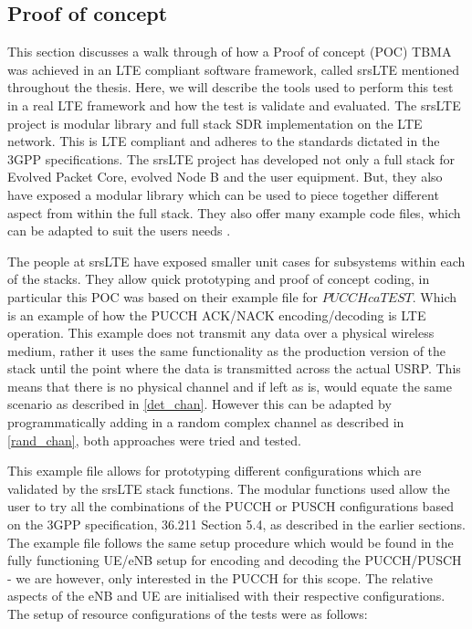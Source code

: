 \documentclass{article}
\begin{document}
\subsection{Proof of concept}\label{srslte_poc}
This section discusses a walk through of how a Proof of concept (POC) TBMA was achieved in an LTE compliant software framework, called srsLTE mentioned throughout the thesis. Here, we will describe the tools used to perform this test in a real LTE framework and how the test is validate and evaluated. The srsLTE project is modular library and full stack SDR implementation on the LTE network. This is LTE compliant and adheres to the standards dictated in the 3GPP specifications. The srsLTE project has developed not only a full stack for Evolved Packet Core, evolved Node B and the user equipment. But, they also have exposed a modular library which can be used to piece together different aspect from within the full stack. They also offer many example code files, which can be adapted to suit the users needs \cite{srsLTE}. 

The people at srsLTE have exposed smaller unit cases for subsystems within each of the stacks. They allow quick prototyping and proof of concept coding, in particular this POC was based on their example file for $PUCCH ca TEST$. Which is an example of how the PUCCH ACK/NACK encoding/decoding is LTE operation. This example does not transmit any data over a physical wireless medium, rather it uses the same functionality as the production version of the stack until the point where the data is transmitted across the actual USRP. This means that there is no physical channel and if left as is, would equate the same scenario as described in \cref{det_chan}. However this can be adapted by programmatically adding in a random complex channel as described in \cref{rand_chan}, both approaches were tried and tested. 

This example file allows for prototyping different configurations which are validated by the srsLTE stack functions. The modular functions used allow the user to try all the combinations of the PUCCH or PUSCH configurations based on the 3GPP specification, 36.211 Section 5.4, as described in the earlier sections. The example file follows the same setup procedure which would be found in the fully functioning UE/eNB setup for encoding and decoding the PUCCH/PUSCH - we are however, only interested in the PUCCH for this scope. The relative aspects of the eNB and UE are initialised with their respective configurations. The setup of resource configurations of the tests were as follows:
\end{document}
